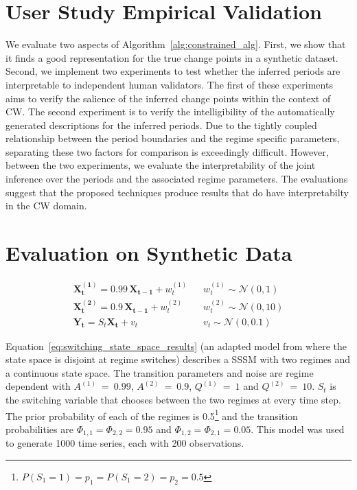 \section{User Study Empirical Validation}\label{sec:user_evaluation}
We evaluate two aspects of Algorithm~\ref{alg:constrained_alg}. First, we show that it finds a good representation for the true change points in a synthetic dataset. Second, we implement two experiments to test whether the inferred periods are interpretable to independent human validators. The first of these experiments aims to verify the salience of the inferred change points within the context of CW. The second experiment is to verify the intelligibility of the automatically generated descriptions for the inferred periods. Due to the tightly coupled relationship between the period boundaries and the regime specific parameters, separating these two factors for comparison is exceedingly difficult. However, between the two experiments, we evaluate the interpretability of the joint inference over the periods and the associated regime parameters. The evaluations suggest that the proposed techniques produce results that do have interpretabilty in the CW domain.

\section{Evaluation on Synthetic Data}

\begin{equation}
  \begin{split}
      \mathbf{X^{(1)}_t} = 0.99 \,\mathbf{X_{t-1}} + w^{(1)}_t \hspace{10pt} & w^{(1)}_t \sim \mathcal{N}(0,1) \\
      \mathbf{X^{(2)}_t} = 0.9 \,\mathbf{X_{t-1}} + w^{(2)}_t \hspace{10pt} & w^{(2)}_t \sim \mathcal{N}(0,10) \\
      \mathbf{Y_t} = S_t\mathbf{X_t} + v_t \hspace{10pt} & v_t \sim \mathcal{N}(0,0.1)
  \end{split}\label{eq:switching_state_space_results}
\end{equation}

Equation~\ref{eq:switching_state_space_results} (an adapted model from \citet{ghahramani2000variational} where the state space is disjoint at regime switches) describes a SSSM with two regimes and a continuous state space. The transition parameters and noise are regime dependent with $A^{(1)}~=~0.99$, $A^{(2)}~=~0.9$, $Q^{(1)}~=~1$ and $Q^{(2)}~=~10$. $S_t$ is the switching variable that chooses between the two regimes at every time step. The prior probability of each of the regimes is 0.5\footnote{$P(S_1=1)=p_1=P(S_1=2)=p_2=0.5$} and the transition probabilities are $\Phi_{1,1} = \Phi_{2,2} = 0.95$ and $\Phi_{1,2} = \Phi_{2,1} = 0.05$. This model was used to generate 1000 time series, each with 200 observations.

